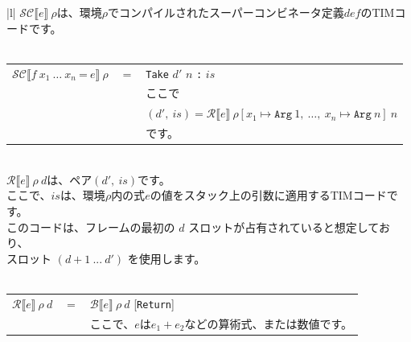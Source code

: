 \documentclass{jbook}
\begin{document}
\begin{tabular} {|l|} \hline
	$\mathcal{SC} \llbracket e \rrbracket ~ \rho$は、環境$\rho$でコンパイルされたスーパーコンビネータ定義$def$のTIMコードです。 \\
	\\
	\begin{tabular}{r c l}
		$\mathcal{SC} \llbracket f ~ x_1 ~ \ldots ~ x_n ~ \texttt{=} ~ e \rrbracket ~ \rho$ & $=$ & \texttt{Take} $d'$ $n$ \texttt{:} $is$                                                                                                \\
		                                                                                    &     & ここで                                                                                                                                \\
		                                                                                    &     & $(d', ~ is) = \mathcal{R} \llbracket e \rrbracket ~ \rho[x_1 \mapsto \texttt{Arg} ~ 1, ~ \ldots, ~ x_n \mapsto \texttt{Arg} ~ n] ~ n$ \\
		                                                                                    &     & です。
	\end{tabular}
	\\ \hline
	$\mathcal{R} \llbracket e \rrbracket ~ \rho ~ d$は、ペア$(d', ~ is)$です。                                                  \\
	ここで、$is$は、環境$\rho$内の式$e$の値をスタック上の引数に適用するTIMコードです。                                          \\
	このコードは、フレームの最初の $d$ スロットが占有されていると想定しており、                                                 \\
	スロット $(d + 1 ~ ... ~ d')$ を使用します。                                                                                \\
	\\
	\begin{tabular}{r c l}
		$\mathcal{R} \llbracket e \rrbracket ~ \rho ~ d$         & $=$ & $\mathcal{B} \llbracket e \rrbracket ~ \rho ~ d$ [\texttt{Return}]                                                      \\
		                                                         &     & ここで、$e$は$e_1 + e_2$などの算術式、または数値です。                                                                  \\

\end{tabular}
\end{tabular}
\end{document}
